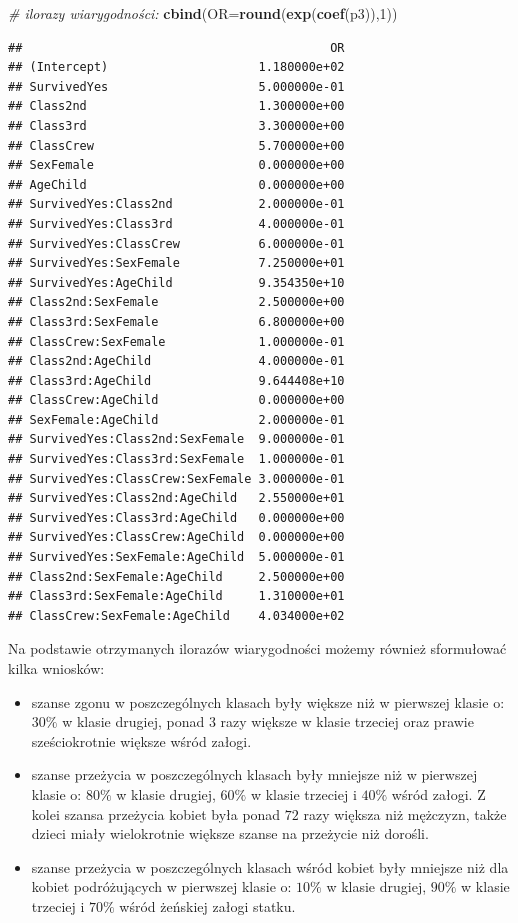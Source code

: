 \documentclass[polish,]{book}
\newenvironment{Shaded}{\begin{snugshade}}{\end{snugshade}}
\newcommand{\CommentTok}[1]{\textcolor[rgb]{0.56,0.35,0.01}{\textit{#1}}}
\newcommand{\DataTypeTok}[1]{\textcolor[rgb]{0.13,0.29,0.53}{#1}}
\newcommand{\DecValTok}[1]{\textcolor[rgb]{0.00,0.00,0.81}{#1}}
\newcommand{\KeywordTok}[1]{\textcolor[rgb]{0.13,0.29,0.53}{\textbf{#1}}}
\newcommand{\NormalTok}[1]{#1}
\begin{document}
\begin{Shaded}
\begin{Highlighting}[]
\CommentTok{# ilorazy wiarygodności:}
\KeywordTok{cbind}\NormalTok{(}\DataTypeTok{OR=}\KeywordTok{round}\NormalTok{(}\KeywordTok{exp}\NormalTok{(}\KeywordTok{coef}\NormalTok{(p3)),}\DecValTok{1}\NormalTok{))}
\end{Highlighting}
\end{Shaded}

\begin{verbatim}
##                                           OR
## (Intercept)                     1.180000e+02
## SurvivedYes                     5.000000e-01
## Class2nd                        1.300000e+00
## Class3rd                        3.300000e+00
## ClassCrew                       5.700000e+00
## SexFemale                       0.000000e+00
## AgeChild                        0.000000e+00
## SurvivedYes:Class2nd            2.000000e-01
## SurvivedYes:Class3rd            4.000000e-01
## SurvivedYes:ClassCrew           6.000000e-01
## SurvivedYes:SexFemale           7.250000e+01
## SurvivedYes:AgeChild            9.354350e+10
## Class2nd:SexFemale              2.500000e+00
## Class3rd:SexFemale              6.800000e+00
## ClassCrew:SexFemale             1.000000e-01
## Class2nd:AgeChild               4.000000e-01
## Class3rd:AgeChild               9.644408e+10
## ClassCrew:AgeChild              0.000000e+00
## SexFemale:AgeChild              2.000000e-01
## SurvivedYes:Class2nd:SexFemale  9.000000e-01
## SurvivedYes:Class3rd:SexFemale  1.000000e-01
## SurvivedYes:ClassCrew:SexFemale 3.000000e-01
## SurvivedYes:Class2nd:AgeChild   2.550000e+01
## SurvivedYes:Class3rd:AgeChild   0.000000e+00
## SurvivedYes:ClassCrew:AgeChild  0.000000e+00
## SurvivedYes:SexFemale:AgeChild  5.000000e-01
## Class2nd:SexFemale:AgeChild     2.500000e+00
## Class3rd:SexFemale:AgeChild     1.310000e+01
## ClassCrew:SexFemale:AgeChild    4.034000e+02
\end{verbatim}

Na podstawie otrzymanych ilorazów wiarygodności możemy również sformułować
kilka wniosków:

\begin{itemize}
\item
  szanse zgonu w poszczególnych klasach były większe niż w pierwszej klasie
  o: \(30\%\) w klasie drugiej, ponad 3 razy większe w klasie trzeciej oraz prawie
  sześciokrotnie większe wśród załogi.
\item
  szanse przeżycia w poszczególnych klasach były mniejsze niż w pierwszej klasie
  o: \(80\%\) w klasie drugiej, \(60\%\) w klasie trzeciej i \(40\%\) wśród załogi. Z kolei szansa
  przeżycia kobiet była ponad \(72\) razy większa niż mężczyzn, także dzieci miały
  wielokrotnie większe szanse na przeżycie niż dorośli.
\item
  szanse przeżycia w poszczególnych klasach wśród kobiet były mniejsze niż dla
  kobiet podróżujących w pierwszej klasie o: \(10\%\) w klasie drugiej, \(90\%\) w klasie
  trzeciej i \(70\%\) wśród żeńskiej załogi statku.
\end{itemize}
\end{document}
